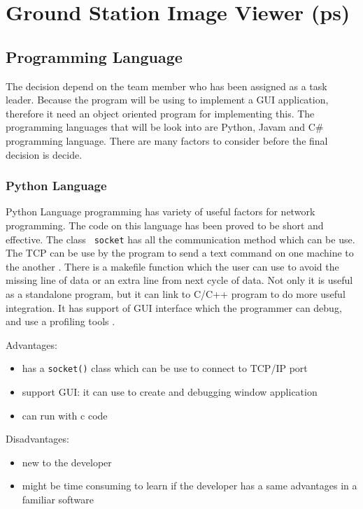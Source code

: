 \section{Ground Station Image Viewer (ps)}

\subsection{Programming Language}

The decision depend on the team member who has been assigned as a task leader.
Because the program will be using to implement a GUI application, therefore it need an object oriented program for implementing this.
The programming languages that will be look into are Python, Javam and C\# programming language.
There are many factors to consider before the final decision is decide.

\subsubsection*{Python Language}
Python Language programming has variety of useful factors for network programming. 
The code on this language has been proved to be short and effective.
The class \texttt{ socket} has all the communication method which can be use. 
The TCP can be use by the program to send a text command on one machine to the another \cite{normanM}. 
There is a makefile function which the user can use to avoid the missing line of data or an extra line from next cycle of data\cite{normanM,guidoR}. Not only it is useful as a standalone program, but it can link to C/C++ program to do more useful integration.
It has support of GUI interface which the programmer can debug, and use a profiling tools \cite{sannerM}. 

Advantages:
\begin{itemize}
\item has a \texttt{socket()} class which can be use to connect to TCP/IP port
\item support GUI: it can use to create and debugging window application
\item can run with c code
\end{itemize}

Disadvantages:
\begin{itemize}
\item new to the developer
\item might be time consuming to learn if the developer has a same advantages in a familiar software
\end{itemize}

